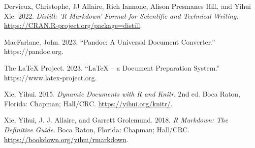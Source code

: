 \hypertarget{refs}{}
\begin{CSLReferences}{1}{0}
\leavevmode{}%
Dervieux, Christophe, JJ Allaire, Rich Iannone, Alison Presmanes Hill, and Yihui Xie. 2022. \emph{Distill: 'R Markdown' Format for Scientific and Technical Writing}. \url{https://CRAN.R-project.org/package=distill}.

\leavevmode{}%
MacFarlane, John. 2023. {``Pandoc: A Universal Document Converter.''} https://pandoc.org.

\leavevmode{}%
The LaTeX Project. 2023. {``LaTeX -- a Document Preparation System.''} https://www.latex-project.org.

\leavevmode{}%
Xie, Yihui. 2015. \emph{Dynamic Documents with {R} and Knitr}. 2nd ed. Boca Raton, Florida: Chapman; Hall/CRC. \url{https://yihui.org/knitr/}.

\leavevmode{}%
Xie, Yihui, J. J. Allaire, and Garrett Grolemund. 2018. \emph{R Markdown: The Definitive Guide}. Boca Raton, Florida: Chapman; Hall/CRC. \url{https://bookdown.org/yihui/rmarkdown}.

\end{CSLReferences}



\address{%
Abhishek Ulayil\\
Student, Institute of Actuaries of India\\%
Mumbai, India\\
%
%
\textit{ORCiD: \href{https://orcid.org/0009-0000-6935-8690}{0009-0000-6935-8690}}\\%
\href{mailto:perricoq@outlook.com}{\nolinkurl{perricoq@outlook.com}}%
}

\address{%
Mitch O'Hara-Wild\\
Monash University\\%
Melbourne, Australia\\
%
%
\textit{ORCiD: \href{https://orcid.org/0000-0001-6729-7695}{0000-0001-6729-7695}}\\%
\href{mailto:mail@mitchelloharawild.com}{\nolinkurl{mail@mitchelloharawild.com}}%
}

\address{%
Christophe Dervieux\\
Posit PBC\\%
Paris, France\\
%
%
\textit{ORCiD: \href{https://orcid.org/0000-0003-4474-2498}{0000-0003-4474-2498}}\\%
\href{mailto:christophe.dervieux@gmail.com}{\nolinkurl{christophe.dervieux@gmail.com}}%
}

